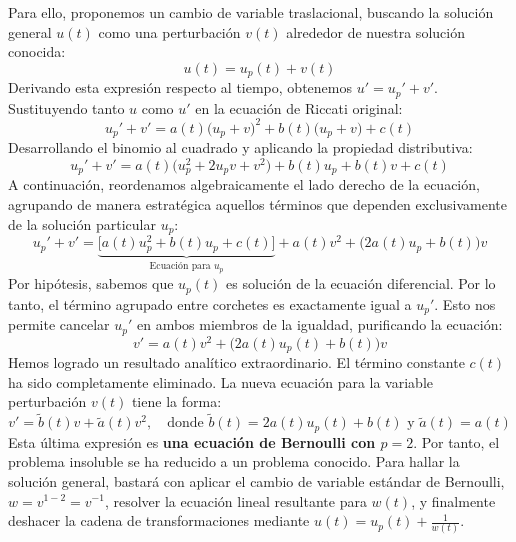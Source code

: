 Para ello, proponemos un cambio de variable traslacional, buscando la solución general $u(t)$ como una perturbación $v(t)$ alrededor de nuestra solución conocida:
\[
    u(t) = u_p(t) + v(t)
\]
Derivando esta expresión respecto al tiempo, obtenemos $u' = u_p' + v'$. Sustituyendo tanto $u$ como $u'$ en la ecuación de Riccati original:
\[
    u_p' + v' = a(t) \big( u_p + v \big)^2 + b(t) \big( u_p + v \big) + c(t)
\]
Desarrollando el binomio al cuadrado y aplicando la propiedad distributiva:
\[
    u_p' + v' = a(t) \big( u_p^2 + 2u_p v + v^2 \big) + b(t)u_p + b(t)v + c(t)
\]
A continuación, reordenamos algebraicamente el lado derecho de la ecuación, agrupando de manera estratégica aquellos términos que dependen exclusivamente de la solución particular $u_p$:
\[
    u_p' + v' = \underbrace{\Big[ a(t)u_p^2 + b(t)u_p + c(t) \Big]}_{\text{Ecuación para } u_p} + a(t)v^2 + \Big( 2a(t)u_p + b(t) \Big)v
\]
Por hipótesis, sabemos que $u_p(t)$ es solución de la ecuación diferencial. Por lo tanto, el término agrupado entre corchetes es exactamente igual a $u_p'$. Esto nos permite cancelar $u_p'$ en ambos miembros de la igualdad, purificando la ecuación:
\[
    v' = a(t)v^2 + \big( 2a(t)u_p(t) + b(t) \big)v
\]
Hemos logrado un resultado analítico extraordinario. El término constante $c(t)$ ha sido completamente eliminado. La nueva ecuación para la variable perturbación $v(t)$ tiene la forma:
\[
    v' = \tilde{b}(t)v + \tilde{a}(t)v^2, \quad \text{donde } \tilde{b}(t) = 2a(t)u_p(t) + b(t) \text{ y } \tilde{a}(t) = a(t)
\]
Esta última expresión es \textbf{una ecuación de Bernoulli con $p = 2$}. Por tanto, el problema insoluble se ha reducido a un problema conocido. Para hallar la solución general, bastará con aplicar el cambio de variable estándar de Bernoulli, $w = v^{1-2} = v^{-1}$, resolver la ecuación lineal resultante para $w(t)$, y finalmente deshacer la cadena de transformaciones mediante $u(t) = u_p(t) + \frac{1}{w(t)}$.
\vspace{0.5cm}

